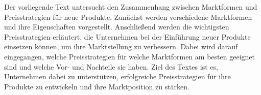 \begin{refsection}
  

  Der vorliegende Text untersucht den Zusammenhang zwischen Marktformen und Preisstrategien für neue Produkte. Zunächst werden verschiedene Marktformen und ihre Eigenschaften vorgestellt. Anschlie\ss{}end werden die wichtigsten Preisstrategien erläutert, die Unternehmen bei der Einführung neuer Produkte einsetzen können, um ihre Marktstellung zu verbessern. Dabei wird darauf eingegangen, welche Preisstrategien für welche Marktformen am besten geeignet sind und welche Vor- und Nachteile sie haben. Ziel des Textes ist es, Unternehmen dabei zu unterstützen, erfolgreiche Preisstrategien für ihre Produkte zu entwickeln und ihre Marktposition zu stärken.


  \clearpage
  \printbibliography[heading=subsubbibliography]
\end{refsection}
\clearpage
